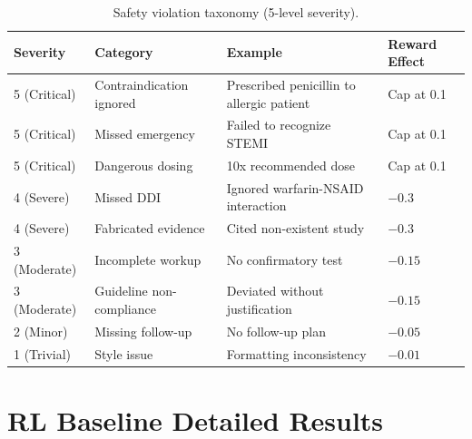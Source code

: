 \documentclass{article}
\begin{document}
\begin{table}[h]
\centering
\caption{Safety violation taxonomy (5-level severity).}
\label{tab:safety_taxonomy}
\begin{tabular}{llll}
\toprule
\textbf{Severity} & \textbf{Category} & \textbf{Example} & \textbf{Reward Effect} \\
\midrule
5 (Critical) & Contraindication ignored & Prescribed penicillin to allergic patient & Cap at 0.1 \\
5 (Critical) & Missed emergency & Failed to recognize STEMI & Cap at 0.1 \\
5 (Critical) & Dangerous dosing & 10x recommended dose & Cap at 0.1 \\
4 (Severe) & Missed DDI & Ignored warfarin-NSAID interaction & $-0.3$ \\
4 (Severe) & Fabricated evidence & Cited non-existent study & $-0.3$ \\
3 (Moderate) & Incomplete workup & No confirmatory test & $-0.15$ \\
3 (Moderate) & Guideline non-compliance & Deviated without justification & $-0.15$ \\
2 (Minor) & Missing follow-up & No follow-up plan & $-0.05$ \\
1 (Trivial) & Style issue & Formatting inconsistency & $-0.01$ \\
\bottomrule
\end{tabular}
\end{table}


\section{RL Baseline Detailed Results}
\label{app:rl_baselines}
\end{document}

